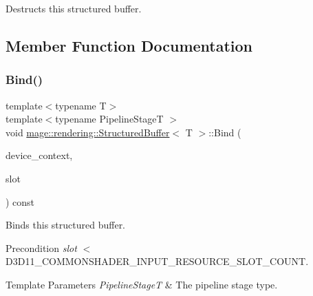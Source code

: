 Destructs this structured buffer. 

\subsection{Member Function Documentation}
\mbox{\label{classmage_1_1rendering_1_1_structured_buffer_aeef55c61fc5331b08c3ae2cba8f8de64}} 
\subsubsection{\texorpdfstring{Bind()}{Bind()}}
{\footnotesize\ttfamily template$<$typename T$>$ \\
template$<$typename Pipeline\+StageT $>$ \\
void \mbox{\hyperlink{classmage_1_1rendering_1_1_structured_buffer}{mage\+::rendering\+::\+Structured\+Buffer}}$<$ T $>$\+::Bind (\begin{DoxyParamCaption}\item[{I\+D3\+D11\+Device\+Context \&}]{device\+\_\+context,  }\item[{\mbox{\hyperlink{namespacemage_aa5d6eaabaac3cdd01873d6a3d27e90f3}{U32}}}]{slot }\end{DoxyParamCaption}) const\hspace{0.3cm}{\ttfamily [noexcept]}}

Binds this structured buffer.

\begin{DoxyPrecond}{Precondition}
{\itshape slot} $<$ {\ttfamily D3\+D11\+\_\+\+C\+O\+M\+M\+O\+N\+S\+H\+A\+D\+E\+R\+\_\+\+I\+N\+P\+U\+T\+\_\+\+R\+E\+S\+O\+U\+R\+C\+E\+\_\+\+S\+L\+O\+T\+\_\+\+C\+O\+U\+NT}. 
\end{DoxyPrecond}

\begin{DoxyTemplParams}{Template Parameters}
{\em Pipeline\+StageT} & The pipeline stage type. \\
\hline
\end{DoxyTemplParams}

